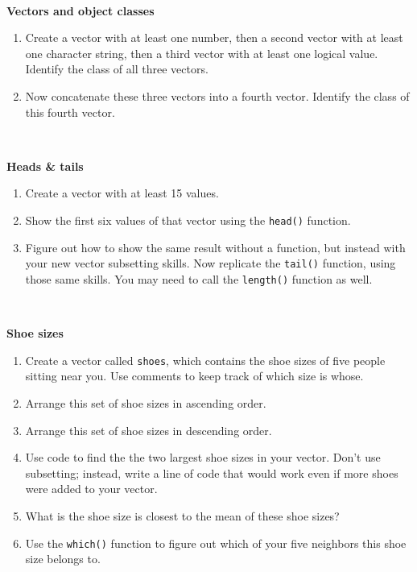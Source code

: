 \documentclass[
]{book}
\begin{document}
~

\textbf{Vectors and object classes}

\begin{enumerate}
\def\labelenumi{\arabic{enumi}.}
\setcounter{enumi}{7}
\item
  Create a vector with at least one number, then a second vector with at least one character string, then a third vector with at least one logical value. Identify the class of all three vectors.
\item
  Now concatenate these three vectors into a fourth vector. Identify the class of this fourth vector.
\end{enumerate}

~

\textbf{Heads \& tails}

\begin{enumerate}
\def\labelenumi{\arabic{enumi}.}
\setcounter{enumi}{9}
\item
  Create a vector with at least 15 values.
\item
  Show the first six values of that vector using the \texttt{head()} function.
\item
  Figure out how to show the same result without a function, but instead with your new vector subsetting skills.
  Now replicate the \texttt{tail()} function, using those same skills. You may need to call the \texttt{length()} function as well.
\end{enumerate}

~

\textbf{Shoe sizes}

\begin{enumerate}
\def\labelenumi{\arabic{enumi}.}
\setcounter{enumi}{12}
\item
  Create a vector called \texttt{shoes}, which contains the shoe sizes of five people sitting near you. Use comments to keep track of which size is whose.
\item
  Arrange this set of shoe sizes in ascending order.
\item
  Arrange this set of shoe sizes in descending order.
\item
  Use code to find the the two largest shoe sizes in your vector. Don't use subsetting; instead, write a line of code that would work even if more shoes were added to your vector.
\item
  What is the shoe size is closest to the mean of these shoe sizes?
\item
  Use the \texttt{which()} function to figure out which of your five neighbors this shoe size belongs to.
\end{enumerate}
\end{document}
